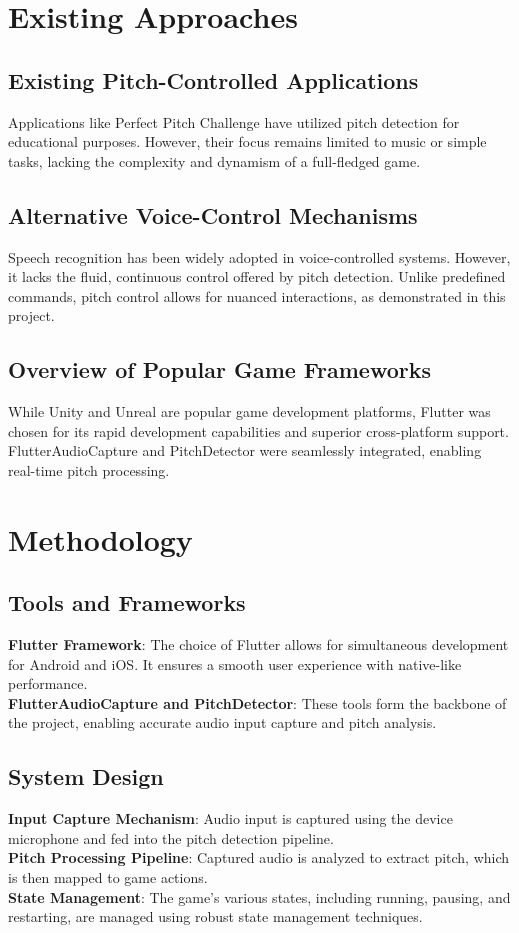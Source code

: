 \documentclass[runningheads]{llncs}
\begin{document}
\section{Existing Approaches}
\subsection{Existing Pitch-Controlled Applications}
Applications like Perfect Pitch Challenge \cite{perfectpitch1, perfectpitch2} have utilized pitch detection for educational purposes. However, their focus remains limited to music or simple tasks, lacking the complexity and dynamism of a full-fledged game.

\subsection{Alternative Voice-Control Mechanisms}
Speech recognition has been widely adopted in voice-controlled systems. However, it lacks the fluid, continuous control offered by pitch detection. Unlike predefined commands, pitch control allows for nuanced interactions, as demonstrated in this project.

\subsection{Overview of Popular Game Frameworks}
While Unity and Unreal are popular game development platforms, Flutter \cite{flutterOverview} was chosen for its rapid development capabilities and superior cross-platform support. FlutterAudioCapture and PitchDetector were seamlessly integrated, enabling real-time pitch processing.

\section{Methodology}
\subsection{Tools and Frameworks}
\textbf{Flutter Framework}: The choice of Flutter allows for simultaneous development for Android and iOS. It ensures a smooth user experience with native-like performance. \\
\textbf{FlutterAudioCapture and PitchDetector}: These tools form the backbone of the project, enabling accurate audio input capture and pitch analysis.

\subsection{System Design}
\textbf{Input Capture Mechanism}: Audio input is captured using the device microphone and fed into the pitch detection pipeline.  \\
\textbf{Pitch Processing Pipeline}: Captured audio is analyzed to extract pitch, which is then mapped to game actions.  \\
\textbf{State Management}: The game's various states, including running, pausing, and restarting, are managed using robust state management techniques.
\end{document}
